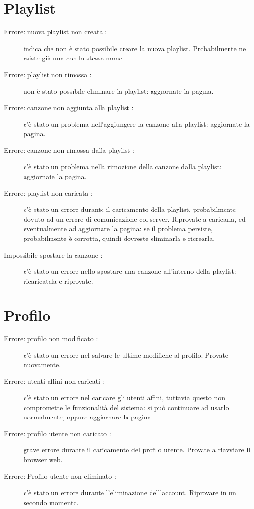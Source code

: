 \section{Playlist}
\begin{description}
	\item [Errore: nuova playlist non creata :] indica che non \`e stato
	possibile creare la nuova playlist. Probabilmente ne esiste gi\`a una con lo
	stesso nome.
	\item [Errore: playlist non rimossa :] non \`e stato possibile
	eliminare la playlist: aggiornate la pagina.
	\item [Errore: canzone non aggiunta alla playlist :] c'\`e stato un
	problema nell'aggiungere la canzone alla playlist: aggiornate la pagina.
	\item [Errore: canzone non rimossa dalla playlist :] c'\`e stato un
	problema nella rimozione della canzone dalla playlist: aggiornate la pagina.
	\item [Errore: playlist non caricata :] c'\`e stato un errore durante
	il caricamento della playlist, probabilmente dovuto ad un errore di
	comunicazione col server. Riprovate a caricarla, ed eventualmente ad aggiornare
	la pagina: se il problema persiste, probabilmente \`e corrotta, quindi dovreste
	eliminarla e ricrearla.
	\item [Impossibile spostare la canzone :] c'\`e stato un errore nello
	spostare una canzone all'interno della playlist: ricaricatela e riprovate.
\end{description}

\section{Profilo}
\begin{description}
	\item[Errore: profilo non modificato :] c'\`e stato un errore nel salvare le
	ultime modifiche al profilo. Provate nuovamente.
	\item[Errore: utenti affini non caricati :] c'\`e stato un errore nel caricare
	gli utenti affini, tuttavia questo non compromette le funzionalit\`a del
	sistema: si pu\`o continuare ad usarlo normalmente, oppure aggiornare la
	pagina.
	\item[Errore: profilo utente non caricato :] grave errore durante il
	caricamento del profilo utente. Provate a riavviare il browser web.
	\item[Errore: Profilo utente non eliminato :] c'\`e stato un errore durante
	l'eliminazione dell'account. Riprovare in un secondo momento.
\end{description}

